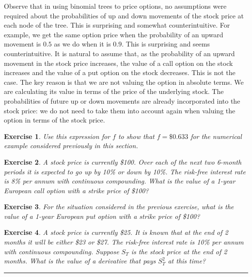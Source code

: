 \documentclass[letterpaper,10pt]{article}
\newtheorem{ex}{Exercise}
\begin{document}
Observe that in using binomial trees to price options, no assumptions were required about the probabilities of up and down movements of the stock price at each node of the tree.  This is surprising and somewhat counterintuitive.  For example, we get the same option price when the probability of an upward movement is $0.5$ as we do when it is $0.9$. This is surprising and seems counterintuitive. It is natural to assume that, as the probability of an upward movement in the stock price increases, the value of a call option on the stock increases and the value of a put option on the stock decreases. This is not the case.  The key reason is that we are not valuing the option in absolute terms. We are calculating its value in terms of the price of the underlying stock. The probabilities of future up or down movements are already incorporated into the stock price: we do not need to take them into account again when valuing the option in terms of the stock price.

\begin{ex}
Use this expression for $f$ to show that $f=\$0.633$ for the numerical example considered previously in this section.
\end{ex}

\begin{ex}
A stock price is currently \$100. Over each of the next two 6-month periods it is expected to go up by 10\% or down by 10\%. The risk-free interest rate is 8\% per annum with continuous compounding. What is the value of a 1-year European call option with a strike price of \$100?
\end{ex}

\begin{ex}
For the situation considered in the previous exercise, what is the value of a 1-year European put option with a strike price of \$100? 
\end{ex}



\begin{ex}
A stock price is currently \$25. It is known that at the end of 2 months it will be either \$23 or \$27. The risk-free interest rate is 10\% per annum with continuous compounding. Suppose $S_T$ is the stock price at the end of 2 months. What is the value of a derivative that pays $S_T^2$ at this time?
\end{ex}

\bigskip

\hrule

\bigskip
\end{document}
